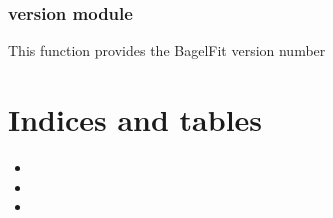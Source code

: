\documentclass[letterpaper,10pt,english]{sphinxmanual}
\begin{document}
\subsection{version module}
\label{\detokenize{src:module-version}}\label{\detokenize{src:version-module}}
\sphinxAtStartPar
This function provides the BagelFit version number


\chapter{Indices and tables}
\label{\detokenize{index:indices-and-tables}}\begin{itemize}
\item {} 
\sphinxAtStartPar
{}

\item {} 
\sphinxAtStartPar
{}

\item {} 
\sphinxAtStartPar
{}

\end{itemize}


\renewcommand{\indexname}{Python Module Index}
\begin{sphinxtheindex}
\let\bigletter\sphinxstyleindexlettergroup
\bigletter{s}
\item\relax{}
\item\relax{}
\indexspace
\bigletter{v}
\item\relax{}
\end{sphinxtheindex}

\renewcommand{\indexname}{Index}
\printindex
\end{document}
